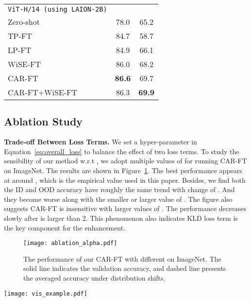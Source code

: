 \documentclass[pdflatex,sn-basic,iicol]{sn-jnl}
\theoremstyle{thmstyleone}\newtheorem{theorem}{Theorem}\newtheorem{proposition}[theorem]{Proposition}
\theoremstyle{thmstyletwo}\newtheorem{example}{Example}\newtheorem{remark}{Remark}
\theoremstyle{thmstylethree}\newtheorem{definition}{Definition}
\begin{document}
\begin{table}[t]
\begin{center}
\begin{tabular}{lc|c}
\midrule
\texttt{ViT-H/14 (using LAION-2B)} & & \\
\quad  Zero-shot & 78.0 & 65.2 \\
\quad  TP-FT & 84.7 & 58.7 \\
\quad  LP-FT & 84.9 & 66.1 \\
\quad  WiSE-FT & 86.0 & 68.2 \\
\rowcolor{tabhighlight}
\quad  CAR-FT & \textbf{86.6} & 69.7 \\
\rowcolor{tabhighlight}
\quad  CAR-FT+WiSE-FT & 86.3 & \textbf{69.9} \\
\bottomrule
\end{tabular}
\end{center}
\end{table}

\subsection{Ablation Study}

\noindent\textbf{Trade-off Between Loss Terms.} We set a hyper-parameter  in Equation~\ref{eq:overall_loss} to balance the effect of two loss terms. To study the sensibility of our method w.r.t , we adopt multiple values of  for running CAR-FT on ImageNet. The results are shown in Figure~\ref{fig:ablation_alpha}. The best performance appears at around , which is the empirical value used in this paper. Besides, we find both the ID and OOD accuracy have roughly the same trend with change of . And they become worse along with the smaller or larger value of . The figure also suggests CAR-FT is insensitive with larger values of . The performance decreases slowly after  is larger than 2. This phenomenon also indicates KLD loss term is the key component for the enhancement. 

\begin{figure}[t]
    \centering
    \texttt{[image: ablation\_alpha.pdf]}
    \caption{The performance of our CAR-FT with different  on ImageNet. The solid line indicates the validation accuracy, and dashed line presents the averaged accuracy under distribution shifts. }
    \label{fig:ablation_alpha}
\end{figure}

\begin{figure*}[t]
    \centering
    \texttt{[image: vis\_example.pdf]}
    \caption{Visualization of top@1 model prediction on context prompt. The text in red presents incorrect prediction. }
    \label{fig:viscontext}
\end{figure*}
\end{document}
